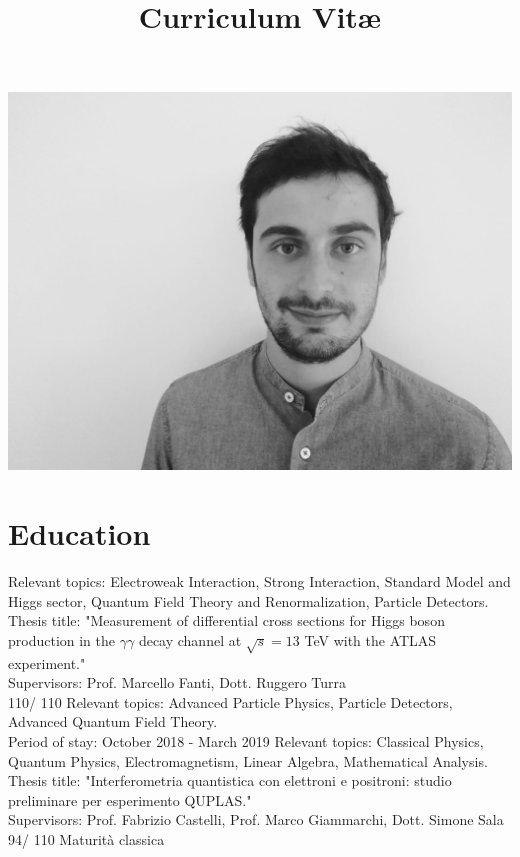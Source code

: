 \documentclass[11pt,a4paper,roman]{moderncv}        %
\title{Curriculum Vit\ae}                               %
\begin{document}
\includegraphics[scale=0.04]{cv_photo.jpeg}
\makecvtitle
\section{Education}
{Relevant topics: Electroweak Interaction, Strong Interaction, Standard Model and Higgs sector, Quantum Field Theory and Renormalization, Particle Detectors. \\
Thesis title: "Measurement of differential cross sections for Higgs boson production in the $\gamma\gamma$ decay channel at $\sqrt{s} = 13$ TeV with the ATLAS experiment." \\
Supervisors: Prof. Marcello Fanti, Dott. Ruggero Turra \\
110/ 110}
{Relevant topics: Advanced Particle Physics, Particle Detectors, Advanced Quantum Field Theory. \\
Period of stay:  October 2018 - March 2019}
{Relevant topics: Classical Physics, Quantum Physics, Electromagnetism, Linear Algebra, Mathematical Analysis. \\ 
Thesis title: "Interferometria quantistica con elettroni e positroni: studio preliminare per esperimento QUPLAS." \\
Supervisors: Prof. Fabrizio Castelli, Prof. Marco Giammarchi, Dott. Simone Sala \\
94/ 110}
{Maturità classica}
\end{document}
